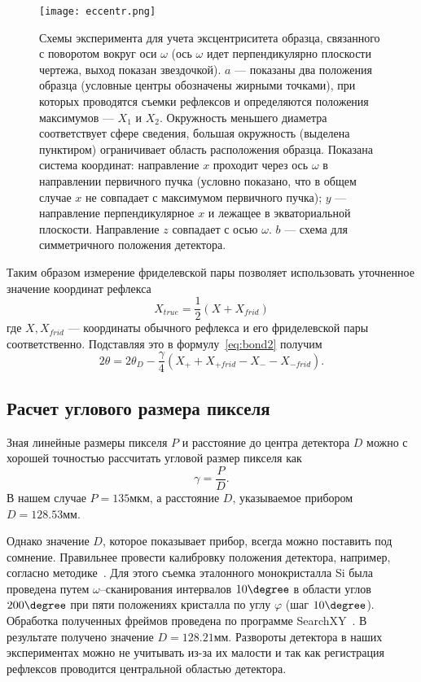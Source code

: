 \begin{figure}[ht!]
    \centering
    \texttt{[image: eccentr.png]}
    \caption{Схемы эксперимента для учета эксцентриситета образца, связанного с поворотом вокруг оси $\omega$ (ось $\omega$ идет перпендикулярно плоскости чертежа, выход показан звездочкой). $a$ --- показаны два положения образца (условные центры обозначены жирными точками), при которых проводятся съемки рефлексов и определяются положения максимумов –-- $X_1$ и $X_2$. Окружность меньшего диаметра соответствует сфере сведения, большая окружность (выделена пунктиром) ограничивает область расположения образца. Показана система координат: направление $x$ проходит через ось $\omega$ в направлении первичного пучка (условно показано, что в общем случае $x$ не совпадает с максимумом первичного пучка); $y$ --– направление перпендикулярное $x$ и лежащее в экваториальной плоскости. Направление $z$ совпадает с осью $\omega$. $b$ –-- схема для симметричного положения детектора.}
    \label{fig:eccentr}
\end{figure}

Таким образом измерение фриделевской пары позволяет использовать уточненное значение координат рефлекса
\[X_{true} = \frac{1}{2}(X + X_{frid})\]
где $X, X_{frid}$ --- координаты обычного рефлекса и его фриделевской пары соответственно.
Подставляя это в формулу~\ref{eq:bond2} получим
\begin{equation} \label{eq:bond4}
    2\theta = 2\theta_D - \frac{\gamma}{4} (X_{+} + X_{+frid} - X_{-} - X_{-frid}).
\end{equation}
\subsection{Расчет углового размера пикселя}
Зная линейные размеры пикселя $P$ и расстояние до центра детектора $D$ можно с хорошей точностью рассчитать угловой размер пикселя как
\begin{equation} \label{eq:gamma_simple}
    \gamma = \frac{P}{D}.
\end{equation}
В нашем случае $P = 135\unit{мкм}$, а расстояние $D$, указываемое прибором $D = 128.53\unit{мм}$.

Однако значение $D$, которое показывает прибор, всегда можно поставить под сомнение.
Правильнее провести калибровку положения детектора, например, согласно методике~\cite{Panchenko:2023}.
Для этого съемка эталонного монокристалла Si была проведена путем $\omega$--сканирования интервалов $10\degree$ в области углов $200\degree$ при пяти положениях кристалла по углу $\varphi$ (шаг $10\degree$).
Обработка полученных фреймов проведена по программе SearchXY~\cite{Panchenko:2023}.
В результате получено значение $D = 128.21\unit{мм}$.
Развороты детектора в наших экспериментах можно не учитывать из-за их малости и так как регистрация рефлексов проводится центральной областью детектора.

